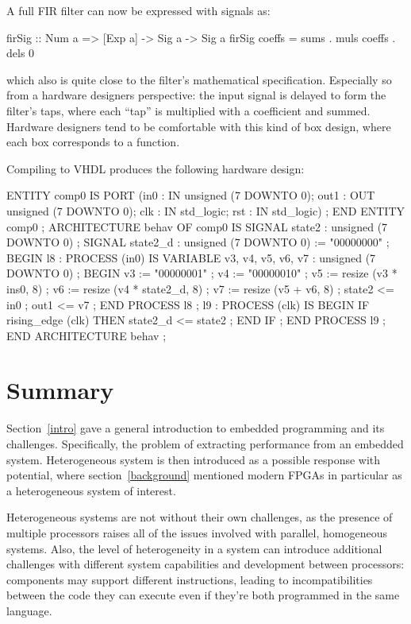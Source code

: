 \documentclass[../paper.tex]{subfiles}
\begin{document}
A full FIR filter can now be expressed with signals as:

\begin{code}
firSig :: Num a => [Exp a] -> Sig a -> Sig a
firSig coeffs = sums . muls coeffs . dels 0
\end{code}

\noindent which also is quite close to the filter's mathematical specification. Especially so from a hardware designers perspective: the input signal is delayed to form the filter's taps, where each ``tap'' is multiplied with a coefficient and summed. Hardware designers tend to be comfortable with this kind of box design, where each box corresponds to a function.

Compiling  to VHDL produces the following hardware design:

\begin{code}
ENTITY comp0 IS
  PORT (in0 : IN unsigned (7 DOWNTO 0);
        out1 : OUT unsigned (7 DOWNTO 0);
        clk : IN std_logic;
        rst : IN std_logic) ;
END ENTITY comp0 ;
ARCHITECTURE behav OF comp0 IS
  SIGNAL state2 : unsigned (7 DOWNTO 0) ;
  SIGNAL state2_d : unsigned (7 DOWNTO 0) := "00000000" ;
BEGIN
  l8 :
    PROCESS (in0) IS
      VARIABLE v3, v4, v5, v6, v7 : unsigned (7 DOWNTO 0) ; 
    BEGIN
      v3 := "00000001" ;
      v4 := "00000010" ;
      v5 := resize (v3 * ins0, 8) ;
      v6 := resize (v4 * state2_d, 8) ;
      v7 := resize (v5 + v6, 8) ;
      state2 <= in0 ;
      out1 <= v7 ;
    END PROCESS l8 ;
  l9 :
    PROCESS (clk) IS
    BEGIN
      IF rising_edge (clk) THEN
        state2_d <= state2 ;
      END IF ;
    END PROCESS l9 ;
END ARCHITECTURE behav ;
\end{code}

\section{Summary}

Section~\ref{intro} gave a general introduction to embedded programming and its challenges. Specifically, the problem of extracting performance from an embedded system. Heterogeneous system is then introduced as a possible response with potential, where section~\ref{background} mentioned modern FPGAs in particular as a heterogeneous system of interest.

Heterogeneous systems are not without their own challenges, as the presence of multiple processors raises all of the issues involved with parallel, homogeneous systems. Also, the level of heterogeneity in a system can introduce additional challenges with different system capabilities and development between processors: components may support different instructions, leading to incompatibilities between the code they can execute even if they're both programmed in the same language.
\end{document}
